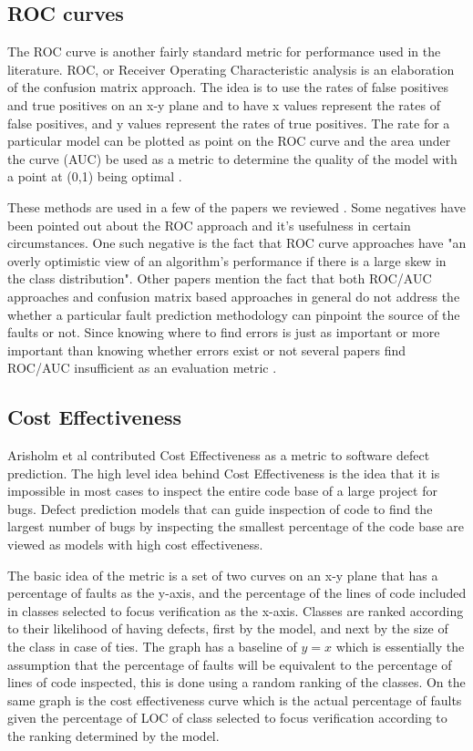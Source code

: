 \documentclass{sig-alternate-05-2015}
\begin{document}
\subsection{ROC curves}

The ROC curve is another fairly standard metric for performance used in the literature.  ROC, or Receiver Operating Characteristic analysis is an elaboration of the confusion matrix approach.  The idea is to use the rates of false positives and true positives on an x-y plane and to have x values represent the rates of false positives, and y values represent the rates of true positives.  The rate for a particular model can be plotted as point on the ROC curve and the area under the curve (AUC) be used as a metric to determine the quality of the model with a point at (0,1) being optimal \cite{Posnett}.  

These methods are used in a few of the papers we reviewed \cite{Rahman} \cite{Arisholm} \cite{Posnett}.  Some negatives have been pointed out about the ROC approach and it's usefulness in certain circumstances.  One such negative is the fact that ROC curve approaches have "an overly optimistic view of an algorithm's performance if there is a large skew in the class distribution".  \cite{Davis}  Other papers mention the fact that both ROC/AUC approaches and confusion matrix based approaches in general do not address the whether a particular fault prediction methodology can pinpoint the source of the faults or not.  Since knowing where to find errors is just as important or more important than knowing whether errors exist or not several papers find ROC/AUC insufficient as an evaluation metric \cite{Posnett} \cite{Arisholm} \cite{Rahman}. 

\subsection{Cost Effectiveness}

Arisholm et al \cite{Arisholm} contributed Cost Effectiveness as a metric to software defect prediction.  The high level idea behind Cost Effectiveness is the idea that it is impossible in most cases to inspect the entire code base of a large project for bugs. Defect prediction models that can guide inspection of code to find the largest number of bugs by inspecting the smallest percentage of the code base are viewed as models with high cost effectiveness.

The basic idea of the metric is a set of two curves on an x-y plane that has a percentage of faults as the y-axis, and the percentage of the lines of code included in classes selected to focus verification as the x-axis.  Classes are ranked according to their likelihood of having defects, first by the model, and next by the size of the class in case of ties.  The graph has a baseline of $y=x$ which is essentially the assumption that the percentage of faults will be equivalent to the percentage of lines of code inspected, this is done using a random ranking of the classes.  On the same graph is the cost effectiveness curve which is the actual percentage of faults given the percentage of LOC of class selected to focus verification according to the ranking determined by the model. 
\end{document}
